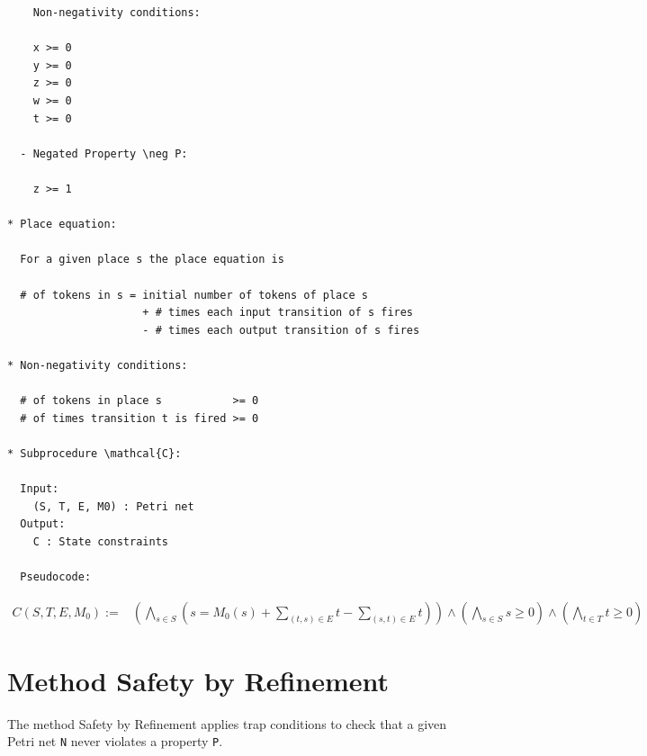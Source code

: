 \documentclass{article}
\begin{document}
\begin{verbatim}
    Non-negativity conditions:
  
    x >= 0
    y >= 0
    z >= 0
    w >= 0
    t >= 0

  - Negated Property \neg P:

    z >= 1

* Place equation:
  
  For a given place s the place equation is

  # of tokens in s = initial number of tokens of place s
                     + # times each input transition of s fires
                     - # times each output transition of s fires

* Non-negativity conditions:

  # of tokens in place s           >= 0
  # of times transition t is fired >= 0

* Subprocedure \mathcal{C}:

  Input:
    (S, T, E, M0) : Petri net
  Output:
    C : State constraints

  Pseudocode:

  \end{verbatim}
\begin{align*}
  C(S, T, E, M_0) :=& \left( \bigwedge_{s \in S} \left(
    s = M_0(s) + \sum_{(t, s) \in E} t - \sum_{(s, t) \in E} t
  \right) \right) \land
    \left( \bigwedge_{s \in S} s \ge 0 \right) \land
    \left( \bigwedge_{t \in T} t \ge 0 \right)
\end{align*}

\newpage

\section{Method Safety by Refinement}

The method Safety by Refinement applies trap conditions to check that a given Petri net \verb=N= never violates a property \verb=P=.
\end{document}
